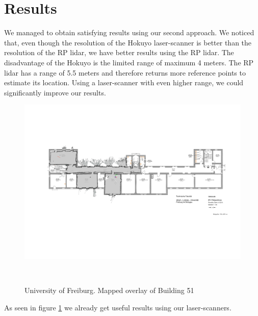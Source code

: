 \documentclass{sigchi-ext}
\begin{document}
\section{Results}
We managed to obtain satisfying results using our second approach. We noticed that, even though the resolution of the Hokuyo laser-scanner is better than the resolution of the RP lidar, we have better results using the RP lidar. The disadvantage of the Hokuyo is the limited range of maximum 4 meters. The RP lidar has a range of 5.5 meters and therefore returns more reference points to estimate its location. Using a laser-scanner with even higher range, we could significantly improve our results.
\begin{figure}
	\includegraphics[width=0.9\columnwidth]{51.png}
	\caption{University of Freiburg. Mapped overlay of Building 51}~\label{fig:b51map}
\end{figure}
As seen in figure \ref{fig:b51map} we already get useful results using our laser-scanners. 
%
%

\balance{} 
\end{document}
